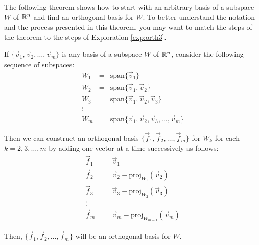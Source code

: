 \documentclass{ximera}
\begin{document}

The following theorem shows how to start with an arbitrary basis of a subspace $W$ of $\mathbb{R}^n$ and find an orthogonal basis for $W$.  To better understand the notation and the process presented in this theorem, you may want to match the steps of the theorem to the steps of Exploration \ref{exp:orth3}.

\begin{theorem} \label{th:GS}
If $\{\vec{v}_{1}, \vec{v}_{2}, \dots , \vec{v}_{m}\}$ is any basis of a subspace $W$ of $\mathbb{R}^n$, consider the following sequence of subspaces:
\begin{equation*}
\begin{array}{ccl}
W_1&=&\mbox{span}\{\vec{v}_{1}\} \\
W_2&=&\mbox{span}\{\vec{v}_{1},\vec{v}_{2}\} \\
W_3&=&\mbox{span}\{\vec{v}_{1},\vec{v}_{2},\vec{v}_{3}\} \\
\vdots &&\\
W_m &=& \mbox{span}\{\vec{v}_{1},\vec{v}_{2},\vec{v}_{3},\ldots,\vec{v}_{m}\}
\end{array}
\end{equation*}

Then we can construct an orthogonal basis $\{\vec{f}_{1},\vec{f}_{2},\ldots,\vec{f}_{m}\}$ for $W_k$ for each $k = 2, 3, \dots , m$ by adding one vector at a time successively as follows:
\begin{equation*}
\begin{array}{ccl}
\vec{f}_{1} &=& \vec{v}_{1} \\
\vec{f}_{2} &=& \vec{v}_{2} - \mbox{proj}_{W_1}(\vec{v}_2) \\
\vec{f}_{3} &=& \vec{v}_{3} - \mbox{proj}_{W_2}(\vec{v}_3) \\
\vdots &&\\
\vec{f}_{m} &=& \vec{v}_{m} - \mbox{proj}_{W_{m-1}}(\vec{v}_m)
\end{array}
\end{equation*}

Then, $\{\vec{f}_{1},\vec{f}_{2},\ldots,\vec{f}_{m}\}$ will be an orthogonal basis for $W$.  
\end{theorem}
\end{document}
